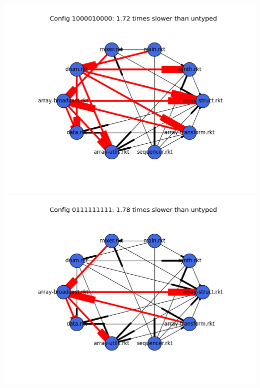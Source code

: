 \documentclass{article}
\begin{document}
\begin{itemize}
\includegraphics[width=\textwidth]{funkytown-module-graph-1000010000.png}
\includegraphics[width=\textwidth]{funkytown-module-graph-0111111111.png}
\end{itemize}
\end{document}
